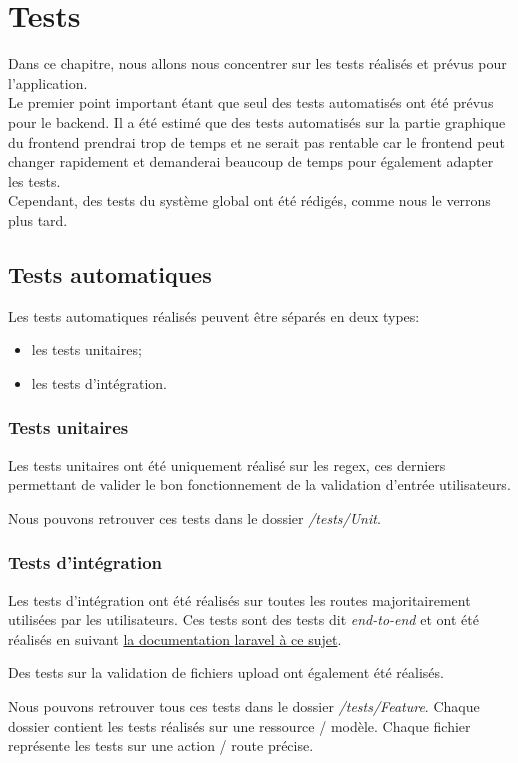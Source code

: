 \documentclass[
    iai, %
    il, %
]{heig-tb}
\begin{document}
\section{Tests}
Dans ce chapitre, nous allons nous concentrer sur les tests réalisés et prévus pour l'application. \\
Le premier point important étant que seul des tests automatisés ont été prévus pour le \Gls{backend}. Il a été estimé que des tests automatisés sur la partie graphique du \Gls{frontend} prendrai trop de temps et ne serait pas rentable car le \Gls{frontend} peut changer rapidement et demanderai beaucoup de temps pour également adapter les tests. \\
Cependant, des tests du système global ont été rédigés, comme nous le verrons plus tard.

\subsection{Tests automatiques}

Les tests automatiques réalisés peuvent être séparés en deux types:
\begin{itemize}
    \item les tests unitaires;
    \item les tests d'intégration.
\end{itemize}

\subsubsection{Tests unitaires}
Les tests unitaires ont été uniquement réalisé sur les \Gls{regex}, ces derniers permettant de valider le bon fonctionnement de la validation d'entrée utilisateurs.

Nous pouvons retrouver ces tests dans le dossier \emph{/tests/Unit}.

\subsubsection{Tests d'intégration}
Les tests d'intégration ont été réalisés sur toutes les routes majoritairement utilisées par les utilisateurs. Ces tests sont des tests dit \emph{end-to-end} et ont été réalisés en suivant \href{https://laravel.com/docs/9.x/http-tests}{la documentation \Gls{laravel} à ce sujet}.

Des tests sur la validation de fichiers upload ont également été réalisés.

Nous pouvons retrouver tous ces tests dans le dossier \emph{/tests/Feature}. Chaque dossier contient les tests réalisés sur une ressource / modèle. Chaque fichier représente les tests sur une action / route précise.
\end{document}
